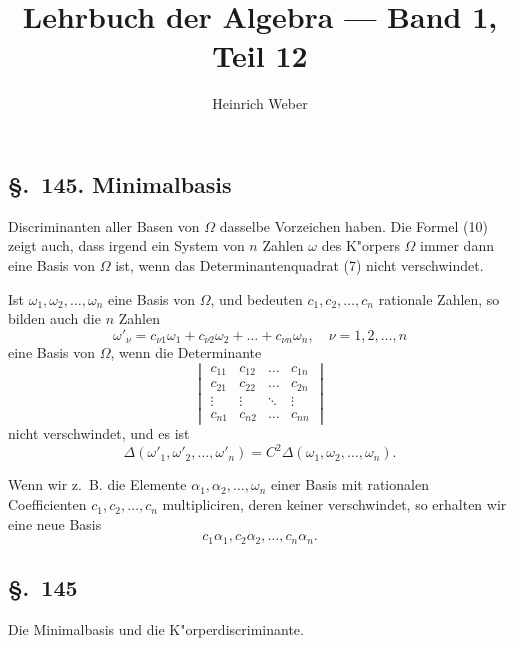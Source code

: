 \documentclass[12pt,a4paper]{article}
\title{Lehrbuch der Algebra --- Band 1, Teil 12}
\author{Heinrich Weber}
\date{}
\theoremstyle{definition}
\begin{document}
\maketitle

\subsection*{\S.~145. Minimalbasis}

Discriminanten aller Basen von $\Omega$ dasselbe Vorzeichen haben. Die Formel (10) zeigt auch, dass irgend ein System von $n$ Zahlen $\omega$ des K"orpers $\Omega$ immer dann eine Basis von $\Omega$ ist, wenn das Determinantenquadrat (7) nicht verschwindet.

Ist $\omega_1, \omega_2, \dots, \omega_n$ eine Basis von $\Omega$, und bedeuten $c_1, c_2, \dots, c_n$ rationale Zahlen, so bilden auch die $n$ Zahlen
\begin{equation}
\omega'_\nu = c_{\nu 1}\omega_1 + c_{\nu 2}\omega_2 + \dots + c_{\nu n}\omega_n, \quad \nu = 1, 2, \dots, n
\end{equation}
eine Basis von $\Omega$, wenn die Determinante
\begin{equation}
\begin{vmatrix}
c_{11} & c_{12} & \dots & c_{1n} \\
c_{21} & c_{22} & \dots & c_{2n} \\
\vdots & \vdots & \ddots & \vdots \\
c_{n1} & c_{n2} & \dots & c_{nn}
\end{vmatrix}
\end{equation}
nicht verschwindet, und es ist
\begin{equation}
\Delta(\omega'_1, \omega'_2, \dots, \omega'_n) = C^2 \Delta(\omega_1, \omega_2, \dots, \omega_n).
\end{equation}

Wenn wir z.~B. die Elemente $\alpha_1, \alpha_2, \dots, \omega_n$ einer Basis mit rationalen Coefficienten $c_1, c_2, \dots, c_n$ multipliciren, deren keiner verschwindet, so erhalten wir eine neue Basis
\begin{equation}
c_1\alpha_1, c_2\alpha_2, \dots, c_n\alpha_n.
\end{equation}

\subsection*{\S.~145}

Die Minimalbasis und die K"orperdiscriminante.
\end{document}

